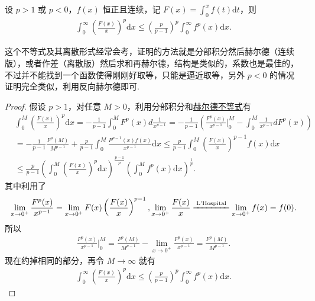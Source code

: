 \documentclass[../../main.tex]{subfiles}
\begin{document}
\begin{theorem}[Hardy不等式]\label{theorem:Hardy(哈代)不等式}
设 $p > 1$ 或 $p < 0$，$f(x)$ 恒正且连续，记 $F(x) = \int_0^x f(t) \mathrm{d}t$，则
\begin{align*}
\int_0^\infty \left( \frac{F(x)}{x} \right)^p \mathrm{d}x \leqslant \left( \frac{p}{p - 1} \right)^p \int_0^\infty f^p(x) \mathrm{d}x.
\end{align*}
\end{theorem}
\begin{remark}
这个不等式及其离散形式经常会考，证明的方法就是分部积分然后赫尔德（连续版），或者作差（离散版）然后求和再赫尔德，结构是类似的，系数也是最佳的，不过并不能找到一个函数使得刚刚好取等，只能是逼近取等，另外 $p < 0$ 的情况证明完全类似，利用反向赫尔德即可.
\end{remark}
\begin{proof}
假设 $p > 1$，对任意 $M > 0$，利用分部积分和\hyperref[theorem:Hold(赫尔德)不等式(积分形式)]{赫尔德不等式}有
\begin{align*}
&\int_0^M \left( \frac{F(x)}{x} \right)^p \mathrm{d}x = -\frac{1}{p - 1} \int_0^M F^p(x) d\frac{1}{x^{p - 1}} = -\frac{1}{p - 1} \left( \frac{F^p(x)}{x^{p - 1}} \bigg|_0^M - \int_0^M \frac{1}{x^{p - 1}} dF^p(x) \right)
\\
&= -\frac{1}{p - 1} \frac{F^p(M)}{M^{p - 1}} + \frac{p}{p - 1} \int_0^M \frac{F^{p - 1}(x) f(x)}{x^{p - 1}} \mathrm{d}x \leqslant \frac{p}{p - 1} \int_0^M \left( \frac{F(x)}{x} \right)^{p - 1} f(x) \mathrm{d}x
\\
&\leqslant \frac{p}{p - 1} \left( \int_0^M \left( \frac{F(x)}{x} \right)^p \mathrm{d}x \right)^{\frac{p - 1}{p}} \left( \int_0^M f^p(x) \mathrm{d}x \right)^{\frac{1}{p}}.
\end{align*}
其中利用了
\begin{align*}
\lim_{x \to 0^+} \frac{F^p(x)}{x^{p - 1}} = \lim_{x \to 0^+} F(x) \left( \frac{F(x)}{x} \right)^{p - 1}, \lim_{x \to 0^+} \frac{F(x)}{x} \xlongequal{\text{L'Hospital}} \lim_{x \to 0^+} f(x) = f(0).
\end{align*}
所以
\begin{align*}
\frac{F^p(x)}{x^{p - 1}} \bigg|_0^M = \frac{F^p(M)}{M^{p - 1}} - \lim_{x \to 0^+} \frac{F^p(x)}{x^{p - 1}} = \frac{F^p(M)}{M^{p - 1}}.
\end{align*}
现在约掉相同的部分，再令 $M \to \infty$ 就有
\begin{align*}
\int_0^\infty \left( \frac{F(x)}{x} \right)^p \mathrm{d}x \leqslant \left( \frac{p}{p - 1} \right)^p \int_0^\infty f^p(x) \mathrm{d}x.
\end{align*}
\end{proof}
\end{document}
